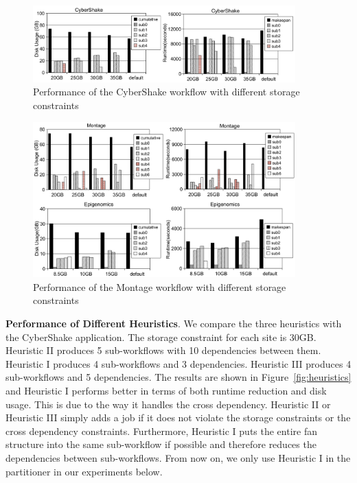 
\begin{figure}[h!]
	\centering
    \includegraphics[width=0.9\textwidth]{figures/partitioning/cybershake.pdf}
    \caption{Performance of the CyberShake workflow with different storage constraints}
    \label{fig:cybershake}
\end{figure}

\begin{figure}[h!]
	\centering
    \includegraphics[width=0.9\textwidth]{figures/partitioning/montage2.pdf}
    \caption{Performance of the Montage workflow with different storage constraints}
    \label{fig:montage}
\end{figure}

\textbf{Performance of Different Heuristics}. We compare the three heuristics with the CyberShake application. The storage constraint for each site is 30GB. Heuristic II produces 5 sub-workflows with 10 dependencies between them. Heuristic I produces 4 sub-workflows and 3 dependencies. Heuristic III produces 4 sub-workflows and 5 dependencies. The results are shown in Figure~\ref{fig:heuristics} and Heuristic I performs better in terms of both runtime reduction and disk usage. This is due to the way it handles the cross dependency. Heuristic II or Heuristic III simply adds a job if it does not violate the storage constraints or the cross dependency constraints. Furthermore, Heuristic I puts the entire fan structure into the same sub-workflow if possible and therefore reduces the dependencies between sub-workflows. 
From now on, we only use Heuristic I in the partitioner in our experiments below.  

